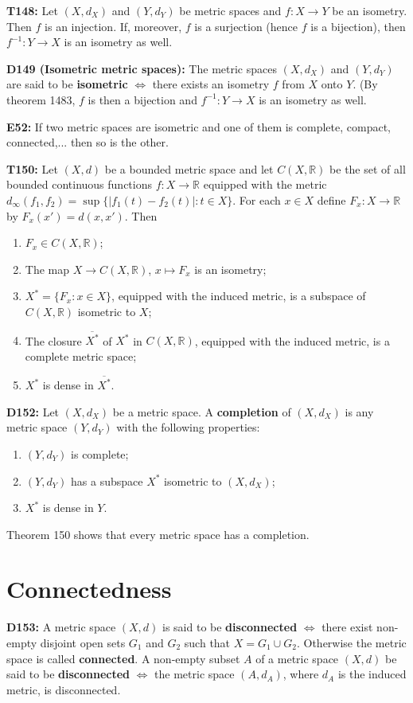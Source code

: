 \documentclass[twocolumn,10pt]{article}
\begin{document}
\textbf{T148:} Let $(X,d_X)$ and $(Y,d_Y)$ be metric spaces and $f:X\to Y$ be an isometry. Then $f$ is an injection. If, moreover, $f$ is a surjection (hence $f$ is a bijection), then $f^{-1}:Y\to X$ is an isometry as well.

\textbf{D149 (Isometric metric spaces):} The metric spaces $(X,d_X)$ and $(Y,d_Y)$ are said to be \textbf{isometric} $\Leftrightarrow$ there exists an isometry $f$ from $X$ onto $Y$. (By theorem 1483, $f$ is then a bijection and $f^{-1}:Y\to X$ is an isometry as well.

\textbf{E52:} If two metric spaces are isometric and one of them is complete, compact, connected,... then so is the other.

\textbf{T150:} Let $(X,d)$ be a bounded metric space and let $C(X,\mathbb{R})$ be the set of all bounded continuous functions $f:X\to\mathbb{R}$ equipped with the metric $d_{\infty}(f_1,f_2)=\sup\{|f_1(t)-f_2(t)|:t\in X\}$. For each $x\in X$ define $F_x:X\to\mathbb{R}$ by $F_x(x')=d(x,x')$. Then
\begin{enumerate}
    \item $F_x\in C(X,\mathbb{R})$;
    \item The map $X\to C(X,\mathbb{R})$, $x\mapsto F_x$ is an isometry;
    \item $X^*=\{F_x:x\in X\}$, equipped with the induced metric, is a subspace of $C(X,\mathbb{R})$ isometric to $X$;
    \item The closure $\overline{X^*}$ of $X^*$ in $C(X,\mathbb{R})$, equipped with the induced metric, is a complete metric space;
    \item $X^*$ is dense in $\overline{X^*}$.
\end{enumerate}
\textbf{D152:} Let $(X,d_X)$ be a metric space. A \textbf{completion} of $(X,d_X)$ is any metric space $(Y,d_Y)$ with the following properties:
\begin{enumerate}
    \item $(Y,d_Y)$ is complete;
    \item $(Y,d_Y)$ has a subspace $X^*$ isometric to $(X,d_X)$;
    \item $X^*$ is dense in $Y$.
\end{enumerate}
Theorem 150 shows that every metric space has a completion.


\section{Connectedness}

\textbf{D153:} A metric space $(X,d)$ is said to be \textbf{disconnected} $\Leftrightarrow$ there exist non-empty disjoint open sets $G_1$ and $G_2$ such that $X=G_1\cup G_2$. Otherwise the metric space is called \textbf{connected}. A non-empty subset $A$ of a metric space $(X,d)$ be said to be \textbf{disconnected} $\Leftrightarrow$ the metric space $(A,d_A)$, where $d_A$ is the induced metric, is disconnected.
\end{document}
